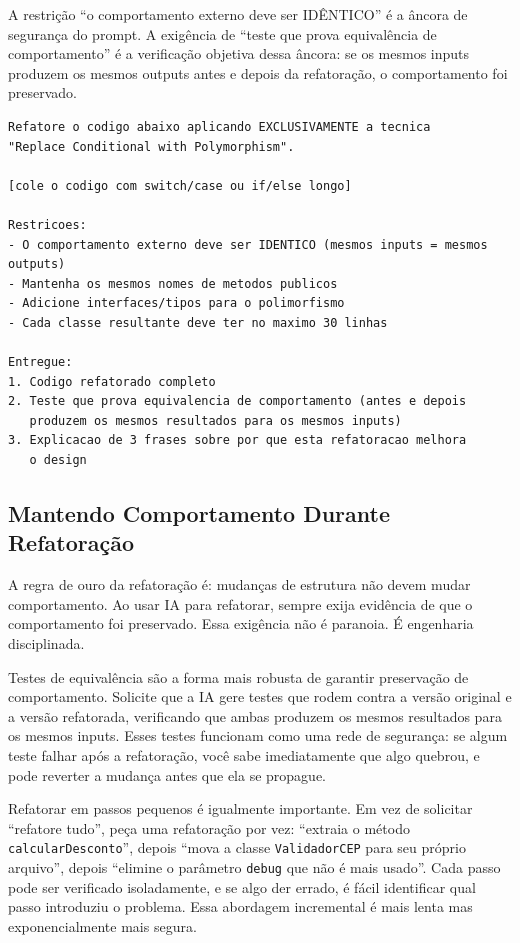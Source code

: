 A restrição ``o comportamento externo deve ser IDÊNTICO'' é a âncora de
segurança do prompt. A exigência de ``teste que prova equivalência de
comportamento'' é a verificação objetiva dessa âncora: se os mesmos inputs
produzem os mesmos outputs antes e depois da refatoração, o comportamento foi
preservado.

\begin{lstlisting}[language={}, caption={Prompt para refatoração dirigida}]
Refatore o codigo abaixo aplicando EXCLUSIVAMENTE a tecnica
"Replace Conditional with Polymorphism".

[cole o codigo com switch/case ou if/else longo]

Restricoes:
- O comportamento externo deve ser IDENTICO (mesmos inputs = mesmos outputs)
- Mantenha os mesmos nomes de metodos publicos
- Adicione interfaces/tipos para o polimorfismo
- Cada classe resultante deve ter no maximo 30 linhas

Entregue:
1. Codigo refatorado completo
2. Teste que prova equivalencia de comportamento (antes e depois
   produzem os mesmos resultados para os mesmos inputs)
3. Explicacao de 3 frases sobre por que esta refatoracao melhora
   o design
\end{lstlisting}

\subsection{Mantendo Comportamento Durante Refatoração}

A regra de ouro da refatoração é: mudanças de estrutura não devem mudar
comportamento. Ao usar IA para refatorar, sempre exija evidência de que o
comportamento foi preservado. Essa exigência não é paranoia. É engenharia
disciplinada.

Testes de equivalência são a forma mais robusta de garantir preservação de
comportamento. Solicite que a IA gere testes que rodem contra a versão original
e a versão refatorada, verificando que ambas produzem os mesmos resultados para os
mesmos inputs. Esses testes funcionam como uma rede de segurança: se algum teste
falhar após a refatoração, você sabe imediatamente que algo quebrou, e pode
reverter a mudança antes que ela se propague.

Refatorar em passos pequenos é igualmente importante. Em vez de solicitar
``refatore tudo'', peça uma refatoração por vez: ``extraia o método
\texttt{calcularDesconto}'', depois ``mova a classe \texttt{ValidadorCEP} para
seu próprio arquivo'', depois ``elimine o parâmetro \texttt{debug} que não é
mais usado''. Cada passo pode ser verificado isoladamente, e se algo der errado,
é fácil identificar qual passo introduziu o problema. Essa abordagem incremental
é mais lenta mas exponencialmente mais segura.

